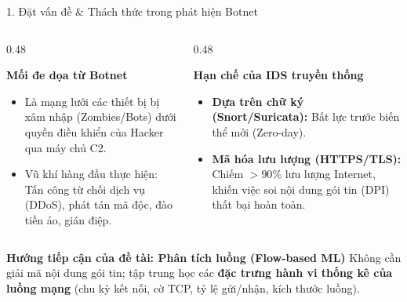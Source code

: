 \documentclass[lualatex,10pt,unknownkeysallowed]{beamer}
\begin{document}
\begin{frame}{1. Đặt vấn đề \& Thách thức trong phát hiện Botnet}
  \begin{columns}[T]
    \begin{column}{0.48\textwidth}
      \begin{block}{\textbf{Mối đe dọa từ Botnet}}
        \begin{itemize}
          \item Là mạng lưới các thiết bị bị xâm nhập (Zombies/Bots) dưới quyền điều khiển của Hacker qua máy chủ C2.
          \item Vũ khí hàng đầu thực hiện: Tấn công từ chối dịch vụ (DDoS), phát tán mã độc, đào tiền ảo, gián điệp.
        \end{itemize}
      \end{block}
    \end{column}
    \begin{column}{0.48\textwidth}
      \begin{alertblock}{\textbf{Hạn chế của IDS truyền thống}}
        \begin{itemize}
          \item \textbf{Dựa trên chữ ký (Snort/Suricata):} Bất lực trước biến thể mới (Zero-day).
          \item \textbf{Mã hóa lưu lượng (HTTPS/TLS):} Chiếm $>90\%$ lưu lượng Internet, khiến việc soi nội dung gói tin (DPI) thất bại hoàn toàn.
        \end{itemize}
      \end{alertblock}
    \end{column}
  \end{columns}

  \vspace{0.3cm}
  \begin{exampleblock}{\textbf{Hướng tiếp cận của đề tài: Phân tích luồng (Flow-based ML)}}
    Không cần giải mã nội dung gói tin; tập trung học các \textbf{đặc trưng hành vi thống kê của luồng mạng} (chu kỳ kết nối, cờ TCP, tỷ lệ gửi/nhận, kích thước luồng).
  \end{exampleblock}
\end{frame}
\end{document}
